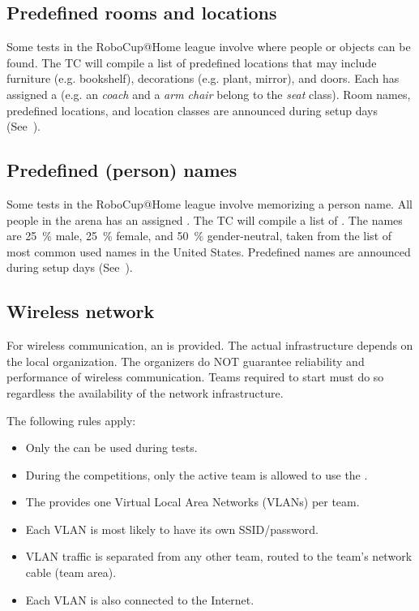 \subsection{Predefined rooms and locations}
\label{rule:scenario_locations}
Some tests in the RoboCup@Home league involve  where people or objects can be found.
The TC will compile a list of predefined locations that may include furniture (e.g. bookshelf), decorations (e.g. plant, mirror), and doors.
Each  has assigned a  (e.g. an \textit{coach} and a \textit{arm chair} belong to the \textit{seat} class).
Room names, predefined locations, and location classes are announced during setup days (See~).



\subsection{Predefined (person) names}\label{rule:scenario_names}
Some tests in the RoboCup@Home league involve memorizing a person name.
All people in the arena has an assigned .
The TC will compile a list of \NumNames {}.
The names are \SI{25}{\percent} male, \SI{25}{\percent} female, and \SI{50}{\percent} gender-neutral, taken from the list of most common used names in the United States.
Predefined names are announced during setup days (See~).


\subsection{Wireless network}
\label{rule:scenario_wifi}

For wireless communication, an  is provided. The actual infrastructure depends on the local organization.
The organizers do NOT guarantee reliability and performance of wireless communication.
Teams required to start must do so regardless the availability of the network infrastructure.

The following rules apply:

\begin{itemize}
	\item Only the  can be used during tests.
	\item During the competitions, only the active team is allowed to use the .
	\item The  provides one Virtual Local Area Networks (VLANs) per team.
	\item Each VLAN is most likely to have its own SSID/password.
	\item VLAN traffic is separated from any other team, routed to the team's network cable (team area).
	\item Each VLAN is also connected to the Internet.
\end{itemize}

